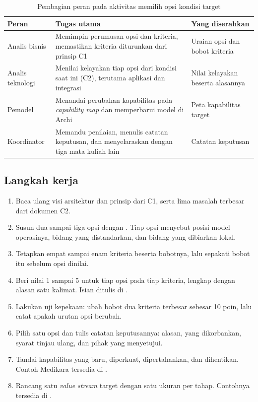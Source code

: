 \begin{table}[!htb]
  \centering
  \caption{Pembagian peran pada aktivitas memilih opsi kondisi target}
  \label{tab:ch08-peran}
  \begin{tabularx}{\textwidth}{l>{\raggedright\arraybackslash}X>{\raggedright\arraybackslash}p{3.4cm}}
    \hline
    \textbf{Peran} & \textbf{Tugas utama} & \textbf{Yang diserahkan} \\
    \hline
    Analis bisnis & Memimpin perumusan opsi dan kriteria, memastikan kriteria diturunkan
      dari prinsip C1 & Uraian opsi dan bobot kriteria \\
    \hline
    Analis teknologi & Menilai kelayakan tiap opsi dari kondisi saat ini (C2), terutama
      aplikasi dan integrasi & Nilai kelayakan beserta alasannya \\
    \hline
    Pemodel & Menandai perubahan kapabilitas pada \textit{capability map} dan memperbarui
      model di Archi & Peta kapabilitas target \\
    \hline
    Koordinator & Memandu penilaian, menulis catatan keputusan, dan menyelaraskan dengan
      tiga mata kuliah lain & Catatan keputusan \\
    \hline
  \end{tabularx}
\end{table}

\subsection*{Langkah kerja}

\begin{enumerate}
  \item Baca ulang visi arsitektur dan prinsip dari C1, serta lima masalah terbesar dari
        dokumen C2.
  \item Susun dua sampai tiga opsi dengan
        . Tiap opsi menyebut
        posisi model operasinya, bidang yang distandarkan, dan bidang yang dibiarkan lokal.
  \item Tetapkan empat sampai enam kriteria beserta bobotnya, lalu sepakati bobot itu
        sebelum opsi dinilai.
  \item Beri nilai 1 sampai 5 untuk tiap opsi pada tiap kriteria, lengkap dengan alasan
        satu kalimat. Isian ditulis di
        .
  \item Lakukan uji kepekaan: ubah bobot dua kriteria terbesar sebesar 10 poin, lalu
        catat apakah urutan opsi berubah.
  \item Pilih satu opsi dan tulis catatan keputusannya: alasan, yang dikorbankan, syarat
        tinjau ulang, dan pihak yang menyetujui.
  \item Tandai kapabilitas yang baru, diperkuat, dipertahankan, dan dihentikan. Contoh
        Medikara tersedia di
        .
  \item Rancang satu \textit{value stream} target dengan satu ukuran per tahap. Contohnya
        tersedia di .
\end{enumerate}

